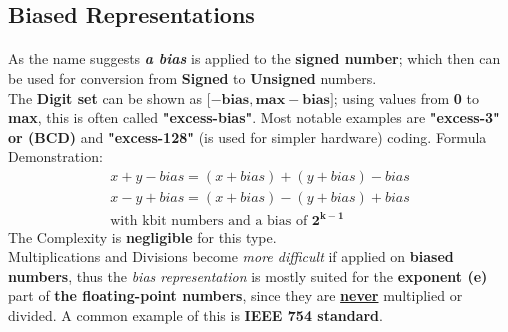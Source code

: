 \subsection{Biased Representations}
\paragraph{}
As the name suggests\textit{\textbf{ a bias}} is applied to the \textbf{signed number}; which then can be used for conversion from\textbf{ Signed} to \textbf{Unsigned} numbers.\\
The\textbf{ Digit set }can be shown as \( \mathbf{{[-bias,max-bias}]} \); using values from \textbf{0} to \textbf{max}, this is often called \textbf{"excess-bias"}. Most notable examples are \textbf{"excess-3" or (BCD)} and \textbf{"excess-128"} (is used for simpler hardware) coding.
Formula Demonstration:\begin{align*}
	x+y-bias=(x+bias)+(y+bias)-bias \\
	x-y+bias=(x+bias)-(y+bias)+bias\\
	\text{with kbit numbers and  a bias of } \mathbf{2^{k-1}}
\end{align*}
The Complexity is\textbf{ negligible} for this type.\\
Multiplications and Divisions become \textit{more difficult} if applied on \textbf{biased numbers}, thus the \textit{bias representation} is mostly suited for the \textbf{exponent (e)} part of \textbf{the floating-point numbers}, since they are \underline{\textbf{never}} multiplied or divided. A common example of this is \textbf{IEEE 754 standard}.